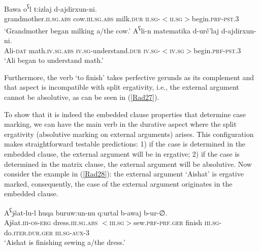 \documentclass[output=paper]{langscibook}
\begin{document}
\ea\label{Rad24}
\gll Bawa o\textsuperscript{ʕ}l t:izlaj d-ajdirxun-ni.\\ 	
grandmother.\textsc{ii.sg.abs} cow.\textsc{iii.sg.abs} milk.\textsc{dur} \textsc{ii.sg-$<$ii.sg$>$}begin.\textsc{prf-pst.3}\\ 
\glt ‘Grandmother began milking a/the cow.’
\ex\label{Rad25}
\gll A\textsuperscript{ʕ}li-n matematika d-urč’laj	d-ajdirxun-ni.\\
Ali-\textsc{dat} math.\textsc{iv.sg.abs} \textsc{iv.sg}-understand.\textsc{dur} \textsc{iv.sg-$<$iv.sg$>$}begin.\textsc{prf-pst.3}\\
\glt ‘Ali began to understand math.’
\z 

Furthermore, the verb ‘to finish’ takes perfective gerunds as its complement and that aspect is incompatible with split ergativity, i.e., the external argument cannot be absolutive, as can be seen in (\ref{Rad27}). 
 
\ea\label{Rad27}
\z 
\z 

To show that it is indeed the embedded clause properties that determine case marking, we can have the main verb in the durative aspect where the split ergativity (absolutive marking on external arguments) arises. This configuration makes straightforward testable predictions: 1) if the case is determined in the embedded clause, the external argument will be in ergative; 2) if the case is determined in the matrix clause, the external argument will be absolutive. Now consider the example in (\ref{Rad28}): the external argument ‘Aishat’ is ergative marked, consequently, the case of the external argument originates in the embedded clause.

\ea\label{Rad28}
\gll A\textsuperscript{ʕ}jšat-lu-l huqa buruw:un-nu q:urtal b-awaj	b-ur-∅.\\
Ajšat.\textsc{iii-os-erg} dress.\textsc{iii.sg.abs} \textsc{$<$iii.sg$>$}sew.\textsc{prf-prf.ger} finish \textsc{iii.sg}-do.\textsc{iter.dur.ger} \textsc{iii.sg-aux-3}\\
\glt ‘Aishat is finishing sewing a/the dress.’
\z 
\end{document}
